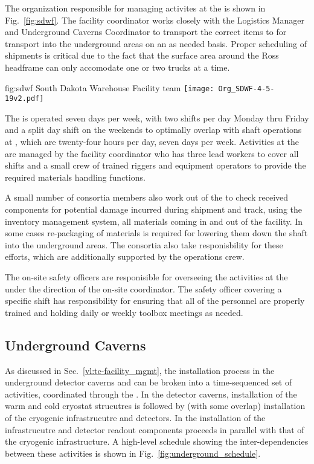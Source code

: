 The organization responsible for managing activites at the 
 is shown in Fig.~\ref{fig:sdwf}.  The facility 
coordinator works closely with the  Logistics 
Manager and Underground Caverns Coordinator to transport the 
correct items to  for transport into the underground
areas on an as needed basis.  Proper scheduling of shipments is 
critical due to the fact that the surface area around the Ross 
headframe can only accomodate one or two trucks at a time.   

\begin{dunefigure}{fig:sdwf}
  {South Dakota Warehouse Facility team}
  \texttt{[image: Org\_SDWF-4-5-19v2.pdf]}
\end{dunefigure}

The  is operated seven days per week, with two shifts 
per day Monday thru Friday and a split day shift on the weekends 
to optimally overlap with shaft operations at , which 
are twenty-four hours per day, seven days per week.  Activities at
the  are managed by the facility coordinator who has  
three lead workers to cover all shifts and a small crew of trained 
riggers and equipment operators to provide the required materials 
handling functions.  

A small number of  consortia members also work out of 
the  to check received components for potential damage 
incurred during shipment and track, using the inventory management 
system, all materials coming in and out of the facility.  In some 
cases re-packaging of materials is required for lowering them down
the shaft into the underground areas.  The  consortia
also take responisbility for these efforts, which are additionally
supported by the  operations crew.   

The on-site safety officers are responisible for overseeing the 
activities at the  under the direction of the on-site 
 coordinator.  The safety officer covering a specific 
shift has responsibility for ensuring that all of the 
personnel are properly trained and holding daily or weekly toolbox 
meetings as needed.

\subsection{Underground Caverns}

As discussed in Sec.~\ref{vl:tc-facility_mgmt}, the installation 
process in the underground detector caverns and  can 
be broken into a time-sequenced set of activities, coordinated 
through the .  In the detector caverns, installation 
of the warm and cold cryostat strucutres is followed by (with 
some overlap) installation of the cryogenic infrastrucutre and 
detectors.  In the  installation of the   
infrastrucutre and detector readout components proceeds in 
parallel with that of the cryogenic infrastructure.  A high-level 
schedule showing the inter-dependencies between these activities 
is shown in Fig.~\ref{fig:underground_schedule}.

